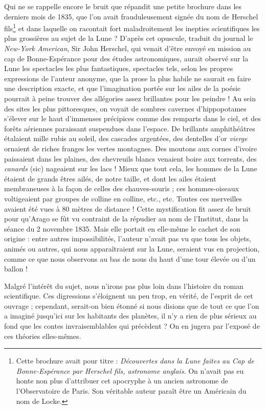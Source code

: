 \documentclass[a4paper, 11pt, oneside]{article}
\begin{document}
Qui ne se rappelle encore le bruit que répandit une petite brochure dans les derniers mois de 1835, que l'on avait frauduleusement signée du nom de Herschel fils\footnote{Cette brochure avait pour titre : \emph{Découvertes dans la Lune faites au Cap de Bonne-Espérance par Herschel fils, astronome anglais}. On n'avait pas eu honte non plus d'attribuer cet apocryphe à un ancien astronome de l'Observatoire de Paris. Son véritable auteur paraît être un Américain du nom de Locke.} et dans laquelle on racontait fort maladroitement les inepties scientifiques les plus grossières au sujet de la Lune ? D'après cet opuscule, traduit du journal le \emph{New-York American}, Sir John Herschel, qui venait d'être envoyé en mission au cap de Bonne-Espérance pour des études astronomiques, aurait observé sur la Lune les spectacles les plus fantastiques, spectacles tels, selon les propres expressions de l'auteur anonyme, que la prose la plus habile ne saurait en faire une description exacte, et que l'imagination portée sur les ailes de la poésie pourrait à peine trouver des allégories assez brillantes pour les peindre ! Au sein des sites les plus pittoresques, on voyait de sombres cavernes d'hippopotames s'élever sur le haut d'immenses précipices comme des remparts dans le ciel, et des forêts aériennes paraissant suspendues dans l'espace. De brillants amphithéâtres étalaient mille rubis au soleil, des cascades argentées, des dentelles d'or \emph{vierge} ornaient de riches franges les vertes montagnes. Des moutons aux cornes d'ivoire paissaient dans les plaines, des chevreuils blancs venaient boire aux torrents, des \emph{canards} (sic) nageaient sur les lacs ! Mieux que tout cela, les hommes de la Lune étaient de grands êtres ailés, de notre taille, et dont les ailes étaient membraneuses à la façon de celles des chauves-souris ; ces hommes-oiseaux voltigeaient par groupes de colline en colline, etc., etc. Toutes ces merveilles avaient été vues à 80 mètres de distance ! Cette mystification fit assez de bruit pour qu'Arago se fût vu contraint de la répudier au nom de l'Institut, dans la séance du 2 novembre 1835. Mais elle portait en elle-même le cachet de son origine : entre autres impossibilités, l'auteur n'avait pas vu que tous les objets, animés ou autres, qui nous apparaîtraient sur la Lune, seraient vus en projection, comme ce que nous observons au bas de nous du haut d'une tour élevée ou d'un ballon !

Malgré l'intérêt du sujet, nous n'irons pas plus loin dans l'histoire du roman scientifique. Ces digressions s'éloignent un peu trop, en vérité, de l'esprit de cet ouvrage ; cependant, serait-on bien étonné si nous disions que de tout ce que l'on a imaginé jusqu'ici sur les habitants des planètes, il n'y a rien de plus sérieux au fond que les contes invraisemblables qui précèdent ? On en jugera par l'exposé de ces théories elles-mêmes.
\end{document}
